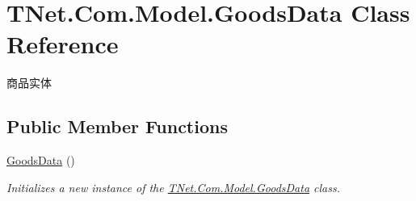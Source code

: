 \hypertarget{class_t_net_1_1_com_1_1_model_1_1_goods_data}{}\section{T\+Net.\+Com.\+Model.\+Goods\+Data Class Reference}
\label{class_t_net_1_1_com_1_1_model_1_1_goods_data}


商品实体  


\subsection*{Public Member Functions}
\begin{DoxyCompactItemize}
\item 
\mbox{\hyperlink{class_t_net_1_1_com_1_1_model_1_1_goods_data_a7971402ddd7dddac2d32d54843db3d24}{Goods\+Data}} ()
\begin{DoxyCompactList}\small\item\em Initializes a new instance of the \mbox{\hyperlink{class_t_net_1_1_com_1_1_model_1_1_goods_data}{T\+Net.\+Com.\+Model.\+Goods\+Data}} class. \end{DoxyCompactList}\end{DoxyCompactItemize}
